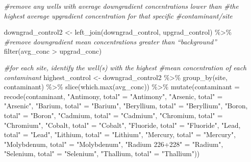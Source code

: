 \documentclass[12pt, twoside]{amherstthesis}
\newenvironment{Shaded}{\begin{snugshade}}{\end{snugshade}}
\newcommand{\AttributeTok}[1]{\textcolor[rgb]{0.77,0.63,0.00}{#1}}
\newcommand{\CommentTok}[1]{\textcolor[rgb]{0.56,0.35,0.01}{\textit{#1}}}
\newcommand{\FunctionTok}[1]{\textcolor[rgb]{0.00,0.00,0.00}{#1}}
\newcommand{\NormalTok}[1]{#1}
\newcommand{\OtherTok}[1]{\textcolor[rgb]{0.56,0.35,0.01}{#1}}
\newcommand{\SpecialCharTok}[1]{\textcolor[rgb]{0.00,0.00,0.00}{#1}}
\newcommand{\StringTok}[1]{\textcolor[rgb]{0.31,0.60,0.02}{#1}}
\begin{document}
\begin{Shaded}
\begin{Highlighting}[]
\CommentTok{\#remove any wells with average downgradient concentrations lower than }
\CommentTok{\#the highest average upgradient concentration for that specific }
\CommentTok{\#contaminant/site}

\NormalTok{downgrad\_control2 }\OtherTok{\textless{}{-}} \FunctionTok{left\_join}\NormalTok{(downgrad\_control, upgrad\_control) }\SpecialCharTok{\%\textgreater{}\%}
  \CommentTok{\#remove downgradient mean concentrations greater than “background”}
  \FunctionTok{filter}\NormalTok{(avg\_conc }\SpecialCharTok{\textgreater{}}\NormalTok{ upgrad\_conc) }


\CommentTok{\#for each site, identify the well(s) with the highest }
\CommentTok{\#mean concentration of each contaminant}
\NormalTok{highest\_control }\OtherTok{\textless{}{-}}\NormalTok{ downgrad\_control2 }\SpecialCharTok{\%\textgreater{}\%}
  \FunctionTok{group\_by}\NormalTok{(site, contaminant) }\SpecialCharTok{\%\textgreater{}\%}
  \FunctionTok{slice}\NormalTok{(}\FunctionTok{which.max}\NormalTok{(avg\_conc)) }\SpecialCharTok{\%\textgreater{}\%}
  \FunctionTok{mutate}\NormalTok{(}\AttributeTok{contaminant =} \FunctionTok{recode}\NormalTok{(contaminant,}
                              \StringTok{"Antimony, total"} \OtherTok{=} \StringTok{"Antimony"}\NormalTok{,}
                              \StringTok{"Arsenic, total"} \OtherTok{=} \StringTok{"Arsenic"}\NormalTok{,}
                              \StringTok{"Barium, total"} \OtherTok{=} \StringTok{"Barium"}\NormalTok{,}
                              \StringTok{"Beryllium, total"} \OtherTok{=} \StringTok{"Beryllium"}\NormalTok{,}
                              \StringTok{"Boron, total"} \OtherTok{=} \StringTok{"Boron"}\NormalTok{,}
                              \StringTok{"Cadmium, total"} \OtherTok{=} \StringTok{"Cadmium"}\NormalTok{,}
                              \StringTok{"Chromium, total"} \OtherTok{=} \StringTok{"Chromium"}\NormalTok{,}
                              \StringTok{"Cobalt, total"} \OtherTok{=} \StringTok{"Cobalt"}\NormalTok{,}
                              \StringTok{"Fluoride, total"} \OtherTok{=} \StringTok{"Fluoride"}\NormalTok{,}
                              \StringTok{"Lead, total"} \OtherTok{=} \StringTok{"Lead"}\NormalTok{,}
                              \StringTok{"Lithium, total"} \OtherTok{=} \StringTok{"Lithium"}\NormalTok{,}
                              \StringTok{"Mercury, total"} \OtherTok{=} \StringTok{"Mercury"}\NormalTok{,}
                              \StringTok{"Molybdenum, total"} \OtherTok{=} \StringTok{"Molybdenum"}\NormalTok{,}
                              \StringTok{"Radium 226+228"} \OtherTok{=} \StringTok{"Radium"}\NormalTok{,}
                              \StringTok{"Selenium, total"} \OtherTok{=} \StringTok{"Selenium"}\NormalTok{,}
                              \StringTok{"Thallium, total"} \OtherTok{=} \StringTok{"Thallium"}\NormalTok{))}


\end{Highlighting}
\end{Shaded}
\end{document}
